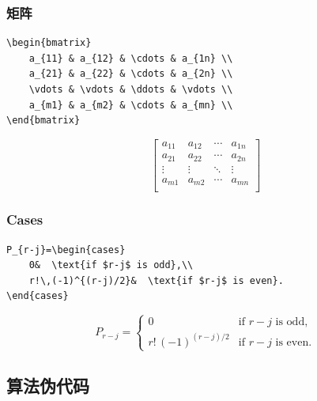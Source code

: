 \documentclass[11pt,a4paper,UTF8]{ctexart}
\begin{document}
\subsubsection*{矩阵}
\begin{lstlisting}[style=latex]
\begin{bmatrix}
    a_{11} & a_{12} & \cdots & a_{1n} \\
    a_{21} & a_{22} & \cdots & a_{2n} \\
    \vdots & \vdots & \ddots & \vdots \\
    a_{m1} & a_{m2} & \cdots & a_{mn} \\
\end{bmatrix}
\end{lstlisting}
\begin{equation}
    \begin{bmatrix}
    a_{11} & a_{12} & \cdots & a_{1n} \\
    a_{21} & a_{22} & \cdots & a_{2n} \\
    \vdots & \vdots & \ddots & \vdots \\
    a_{m1} & a_{m2} & \cdots & a_{mn} \\
    \end{bmatrix}
\end{equation}



\subsubsection*{Cases}
\begin{lstlisting}[style=latex]
P_{r-j}=\begin{cases}
    0&  \text{if $r-j$ is odd},\\
    r!\,(-1)^{(r-j)/2}&  \text{if $r-j$ is even}.
\end{cases}
\end{lstlisting}
\begin{equation}
    P_{r-j}=\begin{cases}
        0&  \text{if $r-j$ is odd},\\
        r!\,(-1)^{(r-j)/2}&  \text{if $r-j$ is even}.
    \end{cases}
\end{equation}

\newpage
\subsection{算法伪代码}

\end{document}
